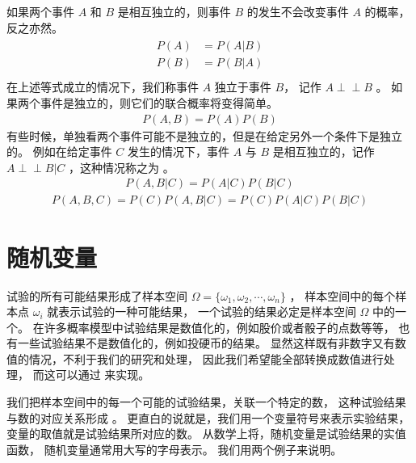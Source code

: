 \documentclass[letterpaper,10pt,english]{sphinxmanual}
\begin{document}
如果两个事件 \(A\) 和 \(B\) 是相互独立的，则事件 \(B\) 的发生不会改变事件
\(A\) 的概率，反之亦然。
\begin{align}\label{equation:概率基础/content:概率基础/content:22}\!\begin{aligned}
P(A) &= P(A|B)\\
P(B) &= P(B|A)\\
\end{aligned}\end{align}
在上述等式成立的情况下，我们称事件 \(A\) 独立于事件 \(B\)，
记作 \(A \perp \!\!\! \perp  B\) 。
如果两个事件是独立的，则它们的联合概率将变得简单。
\begin{equation}\label{equation:概率基础/content:概率基础/content:23}
\begin{split}P(A,B) = P(A)P(B)\end{split}
\end{equation}
有些时候，单独看两个事件可能不是独立的，但是在给定另外一个条件下是独立的。
例如在给定事件 \(C\) 发生的情况下，事件 \(A\) 与 \(B\)
是相互独立的，记作 \(A \perp \!\!\! \perp  B | C\)
，这种情况称之为  。
\begin{equation}\label{equation:概率基础/content:概率基础/content:24}
\begin{split}P(A,B|C) = P(A|C)P(B|C)\end{split}
\end{equation}\begin{equation}\label{equation:概率基础/content:概率基础/content:25}
\begin{split}P(A,B,C) = P(C)P(A,B|C) = P(C) P(A|C)P(B|C)\end{split}
\end{equation}

\section{随机变量}
\label{\detokenize{_u6982_u7387_u57fa_u7840/content:id10}}
试验的所有可能结果形成了样本空间 \(\Omega=\{\omega_1,\omega_2,\cdots,\omega_n\}\) ，
样本空间中的每个样本点 \(\omega_i\) 就表示试验的一种可能结果，
一个试验的结果必定是样本空间 \(\Omega\) 中的一个。
在许多概率模型中试验结果是数值化的，例如股价或者骰子的点数等等，
也有一些试验结果不是数值化的，例如投硬币的结果。
显然这样既有非数字又有数值的情况，不利于我们的研究和处理，
因此我们希望能全部转换成数值进行处理，
而这可以通过  来实现。

我们把样本空间中的每一个可能的试验结果，关联一个特定的数，
这种试验结果与数的对应关系形成  。
更直白的说就是，我们用一个变量符号来表示实验结果，
变量的取值就是试验结果所对应的数。
从数学上将，随机变量是试验结果的实值函数，
随机变量通常用大写的字母表示。
我们用两个例子来说明。
\end{document}
